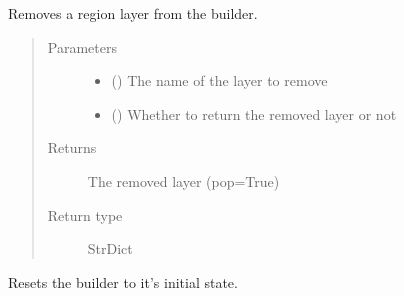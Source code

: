 \documentclass[letterpaper,10pt,english]{sphinxmanual}
\begin{document}
\begin{fulllineitems}
\begin{fulllineitems}
\end{fulllineitems}


\begin{fulllineitems}
\label{\detokenize{builder:geohexviz.builder.PlotBuilder.remove_region}}
\sphinxAtStartPar
Removes a region layer from the builder.
\begin{quote}\begin{description}
\item[{Parameters}] \leavevmode\begin{itemize}
\item {} 
\sphinxAtStartPar
{} () \textendash{} The name of the layer to remove

\item {} 
\sphinxAtStartPar
{} () \textendash{} Whether to return the removed layer or not

\end{itemize}

\item[{Returns}] \leavevmode
\sphinxAtStartPar
The removed layer (pop=True)

\item[{Return type}] \leavevmode
\sphinxAtStartPar
StrDict

\end{description}\end{quote}

\end{fulllineitems}


\begin{fulllineitems}
\label{\detokenize{builder:geohexviz.builder.PlotBuilder.reset}}
\sphinxAtStartPar
Resets the builder to it’s initial state.


\end{fulllineitems}
\end{fulllineitems}
\end{document}

